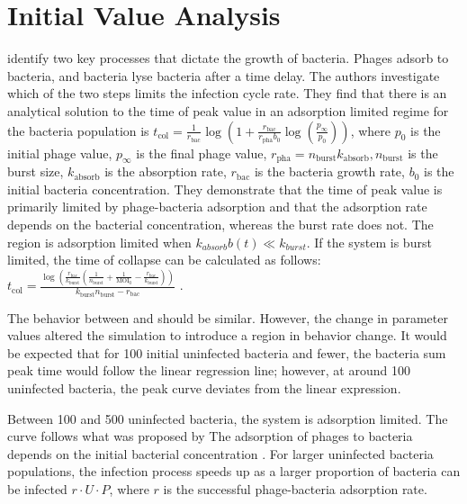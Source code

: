 \section{Initial Value Analysis}
\citet{mullaExtremeDiversityPhage2024} identify two key processes that dictate the growth of bacteria. 
Phages adsorb to bacteria, and bacteria lyse bacteria after a time delay. 
The authors investigate which of the two steps limits the infection cycle rate. 
They find that there is an analytical solution to the time of peak value in an adsorption limited regime for the bacteria population is $t_{\text{col}} = \frac{1}{r_{\text{bac}}} \log\left(1 + \frac{r_{\text{bac}}}{r_{\text{pha}}b_0} \log\left(\frac{p_{\infty}}{p_0}\right)\right)$, where $p_0$ is the initial phage value, $p_\infty$ is the final phage value, $r_{\text{pha}} = n_{\text{burst}} k_{\text{absorb}}, n_{\text{burst}}$ is the burst size, $k_{\text{absorb}}$ is the absorption rate, $r_{\text{bac}}$ is the bacteria growth rate, $b_0$ is the initial bacteria concentration. 
They demonstrate that the time of peak value is primarily limited by phage-bacteria adsorption and that the adsorption rate depends on the bacterial concentration, whereas the burst rate does not. 
The region is adsorption limited when $k_{absorb}b(t) \ll k_{burst}$. 
If the system is burst limited, the time of collapse can be calculated as follows: $t_{\text{col}} = \frac{\log\left(\frac{r_{\text{bac}}}{k_{\text{burst}}}\left(\frac{1}{n_{\text{burst}}} + \frac{1}{\text{MOI}_0} - \frac{r_{\text{bac}}}{k_{\text{burst}}}\right)\right)}{k_{\text{burst}}n_{\text{burst}} - r_{\text{bac}}}$ \cite{mullaExtremeDiversityPhage2024}. 

The behavior between  and  should be similar. However, the change in parameter values altered the simulation to introduce a region in behavior change. 
It would be expected that for 100 initial uninfected bacteria and fewer, the bacteria sum peak time would follow the linear regression line; however, at around 100 uninfected bacteria, the peak curve deviates from the linear expression. 

Between 100 and 500 uninfected bacteria, the system is adsorption limited.
The curve follows what was proposed by \citet{mullaExtremeDiversityPhage2024} 
The adsorption of phages to bacteria depends on the initial bacterial concentration \cite{mullaExtremeDiversityPhage2024}. 
For larger uninfected bacteria populations, the infection process speeds up as a larger proportion of bacteria can be infected $r\cdot U\cdot P$, where $r$ is the successful phage-bacteria adsorption rate. 

